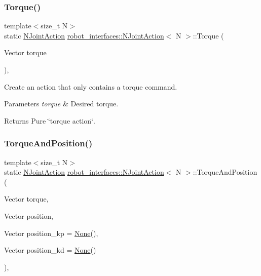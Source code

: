 \subsubsection{\texorpdfstring{Torque()}{Torque()}}
{\footnotesize\ttfamily template$<$size\+\_\+t N$>$ \\
static \hyperlink{structrobot__interfaces_1_1NJointAction}{N\+Joint\+Action} \hyperlink{structrobot__interfaces_1_1NJointAction}{robot\+\_\+interfaces\+::\+N\+Joint\+Action}$<$ N $>$\+::Torque (\begin{DoxyParamCaption}\item[{Vector}]{torque }\end{DoxyParamCaption})\hspace{0.3cm}{\ttfamily [inline]}, {\ttfamily [static]}}



Create an action that only contains a torque command. 


\begin{DoxyParams}{Parameters}
{\em torque} & Desired torque.\\
\hline
\end{DoxyParams}
\begin{DoxyReturn}{Returns}
Pure \char`\"{}torque action\char`\"{}. 
\end{DoxyReturn}
\mbox{\label{structrobot__interfaces_1_1NJointAction_a4c779f6bc160922b65d3a78d0b561f01}} 
\subsubsection{\texorpdfstring{Torque\+And\+Position()}{TorqueAndPosition()}}
{\footnotesize\ttfamily template$<$size\+\_\+t N$>$ \\
static \hyperlink{structrobot__interfaces_1_1NJointAction}{N\+Joint\+Action} \hyperlink{structrobot__interfaces_1_1NJointAction}{robot\+\_\+interfaces\+::\+N\+Joint\+Action}$<$ N $>$\+::Torque\+And\+Position (\begin{DoxyParamCaption}\item[{Vector}]{torque,  }\item[{Vector}]{position,  }\item[{Vector}]{position\+\_\+kp = {\ttfamily \hyperlink{structrobot__interfaces_1_1NJointAction_abb5403bb946dc4b9e9e5e13b9195ad86}{None}()},  }\item[{Vector}]{position\+\_\+kd = {\ttfamily \hyperlink{structrobot__interfaces_1_1NJointAction_abb5403bb946dc4b9e9e5e13b9195ad86}{None}()} }\end{DoxyParamCaption})\hspace{0.3cm}{\ttfamily [inline]}, {\ttfamily [static]}}



